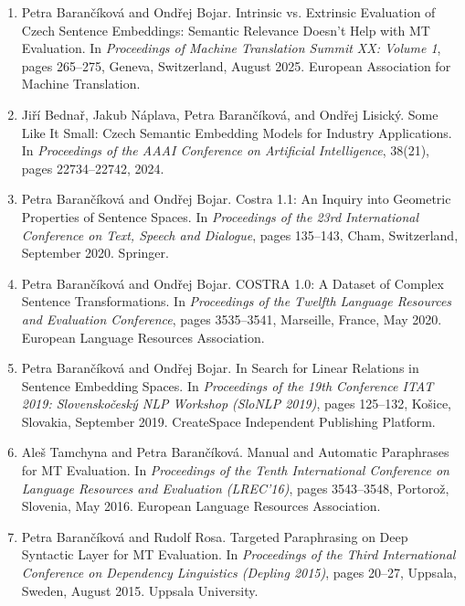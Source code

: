 \documentclass[12pt,a4paper]{report}
\begin{document}
\begin{enumerate}
  \setlength{\itemsep}{0pt}
  \setlength{\parsep}{0pt}
    \item Petra Barančíková and Ondřej Bojar. Intrinsic vs. Extrinsic Evaluation of Czech Sentence Embeddings: Semantic Relevance Doesn't Help with MT Evaluation. In \emph{Proceedings of Machine Translation Summit XX: Volume 1}, pages 265--275, Geneva, Switzerland, August 2025. European Association for Machine Translation.

    \item Jiří Bednař, Jakub Náplava, Petra Barančíková, and Ondřej Lisický. Some Like It Small: Czech Semantic Embedding Models for Industry Applications. In \emph{Proceedings of the AAAI Conference on Artificial Intelligence}, 38(21), pages 22734--22742, 2024.

    \item Petra Barančíková and Ondřej Bojar. Costra 1.1: An Inquiry into Geometric Properties of Sentence Spaces. In \emph{Proceedings of the 23rd International Conference on Text, Speech and Dialogue}, pages 135--143, Cham, Switzerland, September 2020. Springer.

    \item Petra Barančíková and Ondřej Bojar. COSTRA 1.0: A Dataset of Complex Sentence Transformations. In \emph{Proceedings of the Twelfth Language Resources and Evaluation Conference}, pages 3535--3541, Marseille, France, May 2020. European Language Resources Association.

    \item Petra Barančíková and Ondřej Bojar. In Search for Linear Relations in Sentence Embedding Spaces. In \emph{Proceedings of the 19th Conference ITAT 2019: Slovenskočeský NLP Workshop (SloNLP 2019)}, pages 125--132, Košice, Slovakia, September 2019. CreateSpace Independent Publishing Platform.

    \item Aleš Tamchyna and Petra Barančíková. Manual and Automatic Paraphrases for MT Evaluation. In \emph{Proceedings of the Tenth International Conference on Language Resources and Evaluation (LREC'16)}, pages 3543--3548, Portorož, Slovenia, May 2016. European Language Resources Association.

    \item Petra Barančíková and Rudolf Rosa. Targeted Paraphrasing on Deep Syntactic Layer for MT Evaluation. In \emph{Proceedings of the Third International Conference on Dependency Linguistics (Depling 2015)}, pages 20--27, Uppsala, Sweden, August 2015. Uppsala University.


\end{enumerate}
\end{document}
